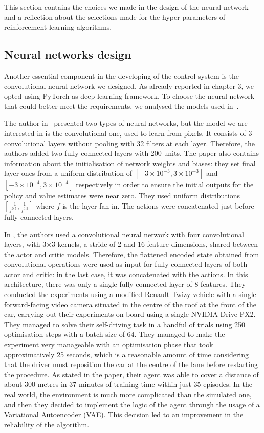 This section contains the choices we made in the design of the neural network and a reflection about the selections made for the hyper-parameters of reinforcement learning algorithms.

\subsection{Neural networks design}

Another essential component in the developing of the control system is the convolutional neural network we designed.
As already reported in chapter 3, we opted using PyTorch as deep learning framework.
To choose the neural network that could better meet the requirements, we analysed the models used in~\cite{lillicrap2015continuous,kendall2018learning,haarnoja2018soft, haarnoja2018alg}.

The author in~\cite{lillicrap2015continuous} presented two types of neural networks, but the model we are interested in is the convolutional one, used to learn from pixels.
It consists of 3 convolutional layers without pooling with 32 filters at each layer.
Therefore, the authors added two fully connected layers with 200 units.
The paper also contains information about the initialisation of network weights and biases: they set final layer ones from a uniform distribution of $[-3\times 10^{-3},3\times 10^{-3}]$ and $[-3\times 10^{-4},3\times 10^{-4}]$ respectively in order to ensure the initial outputs for the policy and value estimates were near zero.
They used uniform distributions $[\frac{-1}{f^{0.5}}, \frac{1}{f^{0.5}}]$ where $f$ is the layer fan-in.
The actions were concatenated just before fully connected layers.

In \cite{kendall2018learning}, the authors used a convolutional neural network with four convolutional layers, with 3$\times$3 kernels, a stride of 2 and 16 feature dimensions, shared between the actor and critic models.
Therefore, the flattened encoded state obtained from convolutional operations were used as input for fully connected layers of both actor and critic: in the last case, it was concatenated with the actions.
In this architecture, there was only a single fully-connected layer of 8 features.
They conducted the experiments using a modified Renault Twizy vehicle with a single forward-facing video camera situated in the centre of the roof at the front of the car, carrying out their experiments on-board using a single NVIDIA Drive PX2.
They managed to solve their self-driving task in a handful of trials using 250 optimisation steps with a batch size of 64.
They managed to make the experiment very manageable with an optimisation phase that took approximatively 25 seconds, which is a reasonable amount of time considering that the driver must reposition the car at the centre of the lane before restarting the procedure.
As stated in the paper, their agent was able to cover a distance of about 300 metres in 37 minutes of training time within just 35 episodes.
In the real world, the environment is much more complicated than the simulated one, and then they decided to implement the logic of the agent through the usage of a Variational Autoencoder (VAE).
This decision led to an improvement in the reliability of the algorithm.

